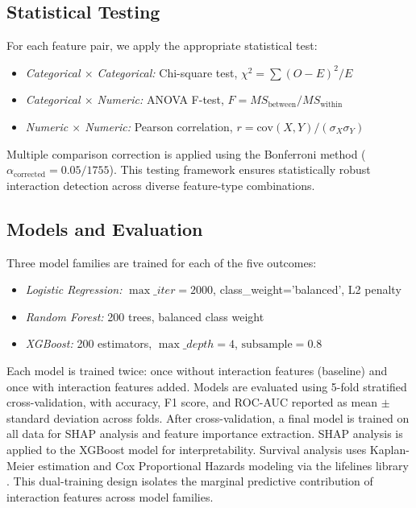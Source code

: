 \documentclass[conference]{IEEEtran}
\begin{document}
\subsection{Statistical Testing}

For each feature pair, we apply the appropriate statistical test:

\begin{itemize}
    \item \textit{Categorical $\times$ Categorical:} Chi-square test, $\chi^2 = \sum (O - E)^2 / E$
    \item \textit{Categorical $\times$ Numeric:} ANOVA F-test, $F = MS_{\text{between}} / MS_{\text{within}}$
    \item \textit{Numeric $\times$ Numeric:} Pearson correlation, $r = \text{cov}(X,Y) / (\sigma_X \sigma_Y)$
\end{itemize}

Multiple comparison correction is applied using the Bonferroni method ($\alpha_{\text{corrected}} = 0.05 / 1755$). This testing framework ensures statistically robust interaction detection across diverse feature-type combinations.

\subsection{Models and Evaluation}

Three model families are trained for each of the five outcomes:

\begin{itemize}
    \item \textit{Logistic Regression:} $\max\_iter=2000$, class\_weight='balanced', L2 penalty
    \item \textit{Random Forest:} 200 trees, balanced class weight
    \item \textit{XGBoost:} 200 estimators, $\max\_depth=4$, $\text{subsample}=0.8$
\end{itemize}

Each model is trained twice: once without interaction features (baseline) and once with interaction features added. Models are evaluated using 5-fold stratified cross-validation, with accuracy, F1 score, and ROC-AUC reported as mean $\pm$ standard deviation across folds. After cross-validation, a final model is trained on all data for SHAP analysis and feature importance extraction. SHAP analysis \cite{lundberg2017unified} is applied to the XGBoost model for interpretability. Survival analysis uses Kaplan-Meier estimation and Cox Proportional Hazards modeling via the lifelines library \cite{davidson2019lifelines}. This dual-training design isolates the marginal predictive contribution of interaction features across model families.
\end{document}
